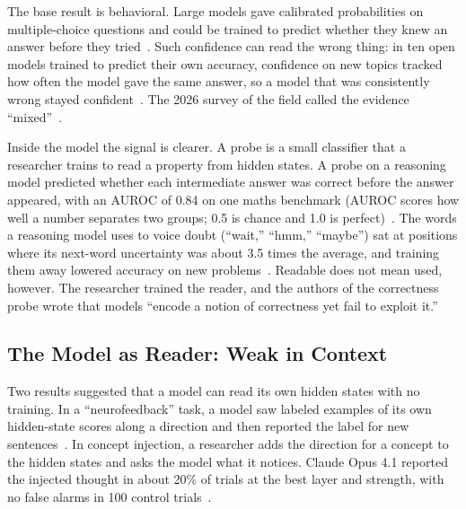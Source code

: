 \documentclass[journal]{IEEEtran}
\begin{document}
The base result is behavioral. Large models gave calibrated probabilities on multiple-choice questions and could be trained to predict whether they knew an answer before they tried~\cite{Kadavath2022}. Such confidence can read the wrong thing: in ten open models trained to predict their own accuracy, confidence on new topics tracked how often the model gave the same answer, so a model that was consistently wrong stayed confident~\cite{Yax2026}. The 2026 survey of the field called the evidence ``mixed''~\cite{Liu2026}.

Inside the model the signal is clearer. A probe is a small classifier that a researcher trains to read a property from hidden states. A probe on a reasoning model predicted whether each intermediate answer was correct before the answer appeared, with an AUROC of 0.84 on one maths benchmark (AUROC scores how well a number separates two groups; 0.5 is chance and 1.0 is perfect)~\cite{Zhang2025}. The words a reasoning model uses to voice doubt (``wait,'' ``hmm,'' ``maybe'') sat at positions where its next-word uncertainty was about 3.5 times the average, and training them away lowered accuracy on new problems~\cite{Kim2026}. Readable does not mean used, however. The researcher trained the reader, and the authors of the correctness probe wrote that models ``encode a notion of correctness yet fail to exploit it.''

\subsection{The Model as Reader: Weak in Context}\label{sec:3.2}

Two results suggested that a model can read its own hidden states with no training. In a ``neurofeedback'' task, a model saw labeled examples of its own hidden-state scores along a direction and then reported the label for new sentences~\cite{JiAn2025}. In concept injection, a researcher adds the direction for a concept to the hidden states and asks the model what it notices. Claude Opus 4.1 reported the injected thought in about 20\% of trials at the best layer and strength, with no false alarms in 100 control trials~\cite{Lindsey2025}.
\end{document}
